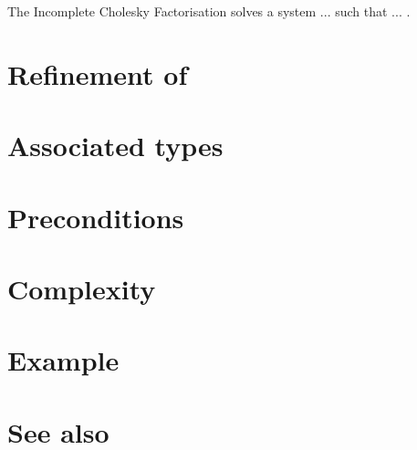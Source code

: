 \documentclass{article}
\begin{document}
The Incomplete Cholesky Factorisation solves a system ... such that ... . 


\section*{Refinement of}


\section*{Associated types}

\section*{Preconditions}


\section*{Complexity}

\section*{Example}


\section*{See also}






\end{document}
